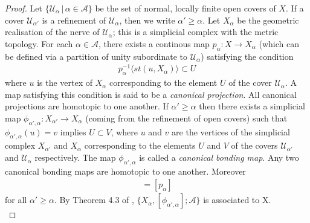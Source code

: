 \documentclass[a4paper,11pt]{article}
\theoremstyle{definition}
\theoremstyle{plain}
\theoremstyle{remark}
\begin{document}
{\begin{proof} Let $\{\mathcal{U}_{\alpha} \,|\, \alpha\in \mathcal{A}\}$ be the set of normal, locally finite open covers of $X$. If a cover $\mathcal{U}_{\alpha'}$ is a refinement of $\mathcal{U}_{\alpha}$, then we write $\alpha'\geq\alpha$. Let $X_{\alpha}$ be the geometric realisation of the nerve of $\mathcal{U}_{\alpha}$; this is a simplicial complex with the metric topology. For each $\alpha\in \mathcal{A}$, there exists a continous map $p_{\alpha}: X\rightarrow X_{\alpha}$ (which can be defined via a partition of unity subordinate to $\mathcal{U}_{\alpha}$) satisfying the condition
\begin{align*}
p_{\alpha}^{-1}\langle st(u,X_{\alpha}) \rangle  \subset U
\end{align*}
where $u$ is the vertex of $X_{\alpha}$ corresponding to the element $U$ of the cover $\mathcal{U}_{\alpha}$. A map satisfying this condition is said to be a  \textit{canonical projection}. All canonical projections are homotopic to one another. If $\alpha'\geq \alpha$ then there exists a simplicial map $\phi_{\alpha',\alpha}: X_{\alpha'}\rightarrow X_{\alpha}$ (coming from the refinement of open covers) such that $\phi_{\alpha',\alpha}(u) = v$ implies $U\subset V$, where $u$ and $v$ are the vertices of the simplicial complex $X_{\alpha'}$ and $X_{\alpha}$ corresponding to the elements $U$ and $V$ of the covers $\mathcal{U}_{\alpha'}$ and $\mathcal{U}_{\alpha}$ respectively. The map $\phi_{\alpha',\alpha}$ is called a \textit{canonical bonding map}. Any two canonical bonding maps are homotopic to one another. Moreover
\begin{align*}
[\phi_{\alpha',\alpha}] [p_{\alpha'}] = [p_{\alpha}]
\end{align*}
for all $\alpha'\geq\alpha$. By Theorem 4.3 of \cite{morita1975vcech}, $\{X_{\alpha},[\phi_{\alpha',\alpha}];\mathcal{A}\}$ is associated to X.\\


\end{proof}}
\end{document}

